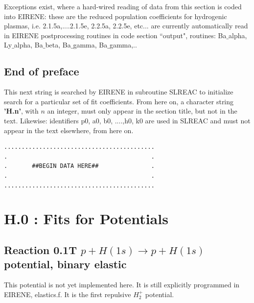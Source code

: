\documentclass[12pt,dvipdfmx]{article}
\begin{document}
Exceptions exist, where a hard-wired reading of data from this section is coded into EIRENE:
these are the reduced population coefficients for hydrogenic plasmas, i.e.
2.1.5a,....2.1.5e, 2.2.5a, 2.2.5e, etc... are currently automatically read in
EIRENE postprocessing routines in code section ``output", routines: Ba$\_$alpha, Ly$\_$alpha, Ba$\_$beta, Ba$\_$gamma, Ba$\_$gamma,..


\subsection{End of preface}
This next string is searched by EIRENE in subroutine SLREAC
to initialize search for a particular set of fit coefficients.
From here on, a character string \textbf{'H.n'}, with $n$ an integer, must only appear in the
section title,
but not in the text. Likewise: identifiers p0, a0, b0, ....,h0, k0 are used
in SLREAC and must not
appear in the text elsewhere, from here on.

\bigskip
\begin{small}\begin{verbatim}
...........................................
.                                         .
.       ##BEGIN DATA HERE##               .
.                                         .
...........................................
\end{verbatim}\end{small}
\newpage
\renewcommand{\theHsection}{arabicsection.\thesection}
\renewcommand\thesection{\arabic{section}}
\setcounter{section}{-1}
\section{H.0 :  Fits for Potentials}\label{secpot}

\subsection{
Reaction 0.1T $ p + H(1s) \rightarrow p + H(1s) $ potential, binary elastic }
This potential is not yet implemented here. It is still explicitly
programmed in EIRENE, elastics.f. It is the first repulsive $H_2^+$
potential.
\end{document}
